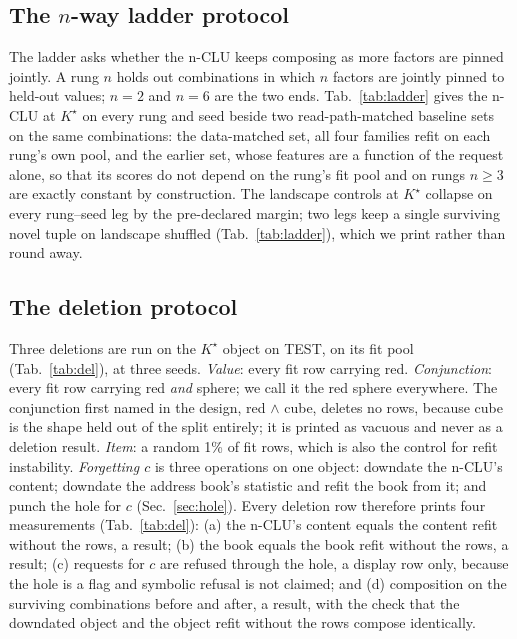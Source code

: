 \documentclass{article} %
\newcommand{\Kstar}{\ensuremath{K^{\star}}}
\begin{document}
\subsection{The $n$-way ladder protocol}

The ladder asks whether the n-CLU keeps composing as more factors are pinned jointly. A rung
$n$ holds out combinations in which $n$ factors are jointly pinned to held-out values; $n=2$ and
$n=6$ are the two ends. Tab.~\ref{tab:ladder} gives the n-CLU at $\Kstar$ on every rung and
seed beside two read-path-matched baseline sets on the same combinations: the data-matched set, all four
families refit on each rung's own pool, and the earlier set, whose features %
are a function of the request alone, so that its scores do not depend on the rung's fit pool and on
rungs $n\ge3$ are exactly constant by construction. %
The landscape controls at $\Kstar$ collapse on every rung--seed leg by the pre-declared margin;
two legs keep a single surviving novel tuple on
landscape shuffled (Tab.~\ref{tab:ladder}), which we print
rather than round away. %

\subsection{The deletion protocol}

Three deletions are run on the $\Kstar$ object on TEST, on its fit pool (Tab.~\ref{tab:del}), at three %
seeds. \emph{Value}: every fit row carrying red. \emph{Conjunction}: every fit row carrying red
\emph{and} sphere; we call it the red sphere everywhere. The conjunction first named in the design,
red $\wedge$ cube, deletes no rows, because cube is the shape held out of the split entirely; it is
printed as vacuous and never as a deletion result. \emph{Item}: a random 1\% of fit rows, which is
also the control for refit instability. \emph{Forgetting $c$} is three operations on one object:
downdate the n-CLU's content; downdate the address book's statistic and refit the book from it; and punch the
hole for $c$ (Sec.~\ref{sec:hole}). Every deletion row therefore prints four measurements
(Tab.~\ref{tab:del}): (a) the n-CLU's content equals the content refit without the rows, a result; (b) the book
equals the book refit without the rows, a result; (c) requests for $c$ are refused through the hole,
a display row only, because the hole is a flag and symbolic refusal is not claimed; and (d)
composition on the surviving combinations before and after, a result, with the check that the downdated
object and the object refit without the rows compose identically.
\end{document}
